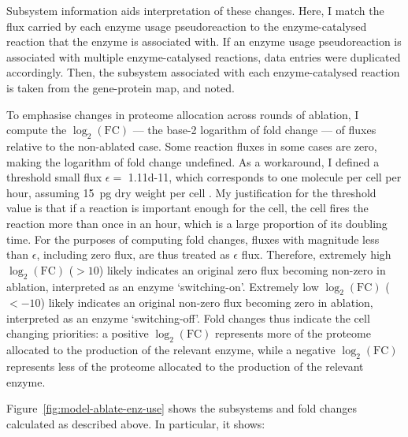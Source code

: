 Subsystem information aids interpretation of these changes.
Here, I match the flux carried by each enzyme usage pseudoreaction to the enzyme-catalysed reaction that the enzyme is associated with.
If an enzyme usage pseudoreaction is associated with multiple enzyme-catalysed reactions, data entries were duplicated accordingly.
Then, the subsystem associated with each enzyme-catalysed reaction is taken from the gene-protein map, and noted.

To emphasise changes in proteome allocation across rounds of ablation, I compute the $\log_{2}(\mathrm{FC})$ --- the base-2 logarithm of fold change --- of fluxes relative to the non-ablated case.
Some reaction fluxes in some cases are zero, making the logarithm of fold change undefined.
As a workaround, I defined a threshold small flux $\epsilon = $ \SI{1.11d-11}{\mmolgdwh}, which corresponds to one molecule per cell per hour, assuming \SI{15}{\pico\gram} dry weight per cell \parencite{shermanGettingStartedYeast2002}.
My justification for the threshold value is that if a reaction is important enough for the cell, the cell fires the reaction more than once in an hour, which is a large proportion of its doubling time.
For the purposes of computing fold changes, fluxes with magnitude less than $\epsilon$, including zero flux, are thus treated as $\epsilon$ flux.
Therefore, extremely high $\log_{2}(\mathrm{FC})$ ($> 10$) likely indicates an original zero flux becoming non-zero in ablation, interpreted as an enzyme `switching-on'.
Extremely low $\log_{2}(\mathrm{FC})$ ($< -10$) likely indicates an original non-zero flux becoming zero in ablation, interpreted as an enzyme `switching-off'.
Fold changes thus indicate the cell changing priorities: a positive $\log_{2}(\mathrm{FC})$ represents more of the proteome allocated to the production of the relevant enzyme, while a negative $\log_{2}(\mathrm{FC})$ represents less of the proteome allocated to the production of the relevant enzyme.

Figure~\ref{fig:model-ablate-enz-use} shows the subsystems and fold changes calculated as described above.
In particular, it shows:

